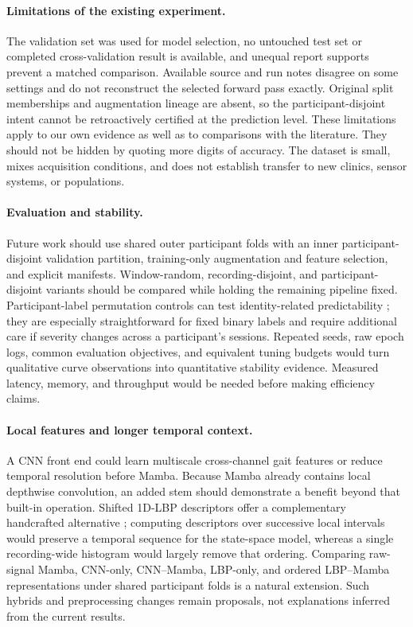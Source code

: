 \paragraph{Limitations of the existing experiment.}
The validation set was used for model selection, no untouched test set or completed cross-validation result is available, and unequal report supports prevent a matched comparison. Available source and run notes disagree on some settings and do not reconstruct the selected forward pass exactly. Original split memberships and augmentation lineage are absent, so the participant-disjoint intent cannot be retroactively certified at the prediction level. These limitations apply to our own evidence as well as to comparisons with the literature. They should not be hidden by quoting more digits of accuracy. The dataset is small, mixes acquisition conditions, and does not establish transfer to new clinics, sensor systems, or populations.

\paragraph{Evaluation and stability.}
Future work should use shared outer participant folds with an inner participant-disjoint validation partition, training-only augmentation and feature selection, and explicit manifests. Window-random, recording-disjoint, and participant-disjoint variants should be compared while holding the remaining pipeline fixed. Participant-label permutation controls can test identity-related predictability \citep{chaibub2019}; they are especially straightforward for fixed binary labels and require additional care if severity changes across a participant's sessions. Repeated seeds, raw epoch logs, common evaluation objectives, and equivalent tuning budgets would turn qualitative curve observations into quantitative stability evidence. Measured latency, memory, and throughput would be needed before making efficiency claims.

\paragraph{Local features and longer temporal context.}
A CNN front end could learn multiscale cross-channel gait features or reduce temporal resolution before Mamba. Because Mamba already contains local depthwise convolution, an added stem should demonstrate a benefit beyond that built-in operation. Shifted 1D-LBP descriptors offer a complementary handcrafted alternative \citep{ertugrul2016}; computing descriptors over successive local intervals would preserve a temporal sequence for the state-space model, whereas a single recording-wide histogram would largely remove that ordering. Comparing raw-signal Mamba, CNN-only, CNN--Mamba, LBP-only, and ordered LBP--Mamba representations under shared participant folds is a natural extension. Such hybrids and preprocessing changes remain proposals, not explanations inferred from the current results.

